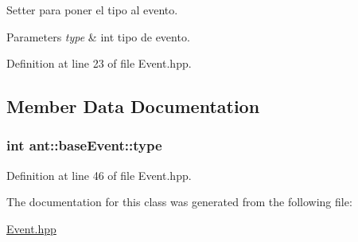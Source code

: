 Setter para poner el tipo al evento. 


\begin{DoxyParams}{Parameters}
{\em type} & int tipo de evento. \\
\hline
\end{DoxyParams}


Definition at line 23 of file Event.\+hpp.



\subsection{Member Data Documentation}
\hypertarget{classant_1_1base_event_a432df0c459b20666e81c53ffab82caf4}{
\subsubsection[{type}]{\setlength{\rightskip}{0pt plus 5cm}int ant\+::base\+Event\+::type\hspace{0.3cm}{\ttfamily [private]}}}\label{classant_1_1base_event_a432df0c459b20666e81c53ffab82caf4}


Definition at line 46 of file Event.\+hpp.



The documentation for this class was generated from the following file\+:\begin{DoxyCompactItemize}
\item 
\hyperlink{_event_8hpp}{Event.\+hpp}\end{DoxyCompactItemize}

